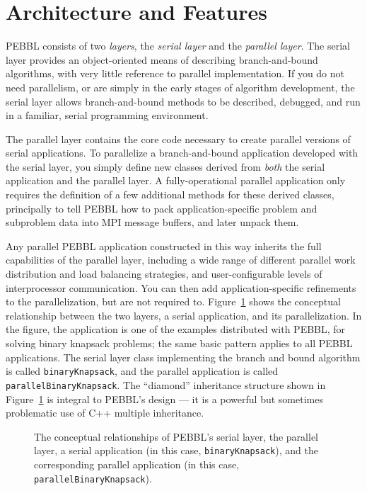 \section{Architecture and Features}


PEBBL consists of two \emph{layers}, the \emph{serial layer} and the
\emph{parallel layer}.  The serial layer provides an object-oriented
means of describing branch-and-bound algorithms, with very little
reference to parallel implementation.  If you do not need parallelism,
or are simply in the early stages of algorithm development, the serial
layer allows branch-and-bound methods to be described, debugged, and
run in a familiar, serial programming environment.

The parallel layer contains the core code necessary to create parallel
versions of serial applications.  To parallelize a branch-and-bound
application developed with the serial layer, you simply define
new classes derived from \emph{both} the serial application and the parallel
layer.  A fully-operational parallel application only requires the
definition of a few additional methods for these derived classes,
principally to tell PEBBL how to pack application-specific problem and
subproblem data into MPI message buffers, and later unpack them.

Any parallel PEBBL application constructed in this way inherits the
full capabilities of the parallel layer, including a wide range of
different parallel work distribution and load balancing strategies,
and user-configurable levels of interprocessor communication.  You can
then add application-specific refinements to the parallelization, but
are not required to. Figure~\ref{fig:layers} shows the conceptual
relationship between the two layers, a serial application, and its
parallelization.  In the figure, the application is one of the
examples distributed with PEBBL, for solving binary knapsack problems;
the same basic pattern applies to all PEBBL applications.  The serial
layer class implementing the branch and bound algorithm is called
\texttt{binaryKnapsack}, and the parallel application is called
\texttt{parallelBinaryKnapsack}.  The ``diamond'' inheritance
structure shown in Figure~\ref{fig:layers} is integral to PEBBL's
design --- it is a powerful but sometimes problematic use of C++
multiple inheritance.

\begin{figure}[tpb]
\begin{center}
\vspace{-0.2in}
\end{center}
\caption{The conceptual relationships of PEBBL's serial layer, the
parallel layer, a serial application (in this case,
\texttt{binaryKnapsack}), and the corresponding parallel application
(in this case, \texttt{parallelBinaryKnapsack}).
\label{fig:layers}
}
\end{figure}


